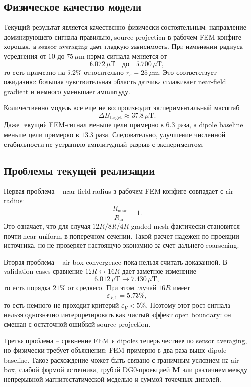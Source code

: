 \documentclass[12pt,a4paper]{article}
\begin{document}
\subsection*{Физическое качество модели}

Текущий результат является качественно физически состоятельным: направление
доминирующего сигнала правильно, source projection в рабочем FEM-конфиге
хорошая, а sensor averaging дает гладкую зависимость. При изменении радиуса
усреднения от \(10\) до \(75\,\mu\mathrm{m}\) норма сигнала меняется от
\[
    6.072\,\mu\mathrm{T}
    \quad \text{до} \quad
    5.700\,\mu\mathrm{T},
\]
то есть примерно на \(5.2\%\) относительно \(r_s=25\,\mu\mathrm{m}\). Это
соответствует ожиданию: большая чувствительная область датчика сглаживает
near-field gradient и немного уменьшает амплитуду.

Количественно модель все еще не воспроизводит экспериментальный масштаб
\[
    \Delta B_{\mathrm{target}}\approx 37.8\,\mu\mathrm{T}.
\]
Даже текущий FEM-сигнал меньше цели примерно в \(6.3\) раза, а dipole baseline
меньше цели примерно в \(13.3\) раза. Следовательно, улучшение численной
стабильности не устранило амплитудный разрыв с экспериментом.

\subsection*{Проблемы текущей реализации}

Первая проблема -- near-field radius в рабочем FEM-конфиге совпадает с air
radius:
\[
    \frac{R_{\mathrm{near}}}{R_{\mathrm{air}}}=1.
\]
Это означает, что для случая \(12R/8R/4R\) graded mesh фактически становится
почти near-uniform в поперечном сечении. Такой расчет надежен по проекции
источника, но не проверяет настоящую экономию за счет дальнего coarsening.

Вторая проблема -- air-box convergence пока нельзя считать доказанной. В
validation cases сравнение \(12R\leftrightarrow 16R\) дает заметное изменение
\[
    6.012\,\mu\mathrm{T}\rightarrow 7.430\,\mu\mathrm{T},
\]
то есть порядка \(21\%\) от среднего. При этом случай \(16R\) имеет
\[
    \varepsilon_{V,1}=5.73\%,
\]
то есть немного не проходит критерий \(\varepsilon_V<5\%\). Поэтому этот рост
сигнала нельзя однозначно интерпретировать как чистый эффект open boundary:
он смешан с остаточной ошибкой source projection.

Третья проблема -- сравнение FEM и dipoles теперь честнее по sensor averaging,
но физически требует объяснения: FEM примерно в два раза выше dipole baseline.
Такое расхождение может быть связано с граничным условием на air box, слабой
формой источника, грубой DG0-проекцией \(\mathbf M\) или различием между
непрерывной магнитостатической моделью и суммой точечных диполей.
\end{document}
